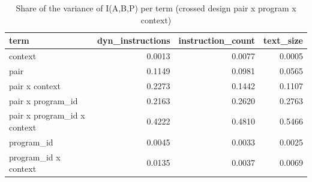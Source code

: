\begin{table}[t]
\centering
\caption{Share of the variance of I(A,B,P) per term (crossed design pair x program x context)}
\label{tab:rq1-variance-decomposition}
\begin{tabular}{lrrr}
\toprule
term & dyn\_instructions & instruction\_count & text\_size \\
\midrule
context & 0.0013 & 0.0077 & 0.0005 \\
pair & 0.1149 & 0.0981 & 0.0565 \\
pair x context & 0.2273 & 0.1442 & 0.1107 \\
pair x program\_id & 0.2163 & 0.2620 & 0.2763 \\
pair x program\_id x context & 0.4222 & 0.4810 & 0.5466 \\
program\_id & 0.0045 & 0.0033 & 0.0025 \\
program\_id x context & 0.0135 & 0.0037 & 0.0069 \\
\bottomrule
\end{tabular}
\end{table}
